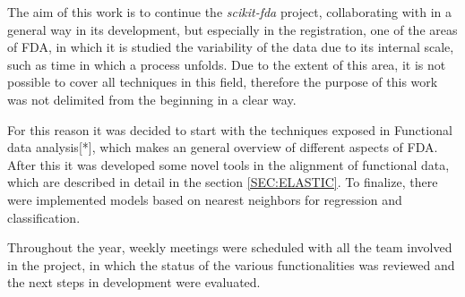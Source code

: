 The aim of this work is to continue the \textit{scikit-fda} project,
collaborating with in a general way in its development, but especially in the
registration, one of the areas of FDA, in which it is studied the
variability of the data due to its internal scale, such as time
in which a process unfolds. Due to the extent of this area, it is not possible
to cover all techniques in this field, therefore the purpose of this work was
not delimited from the beginning in a clear way.

For this reason it was decided to start with the techniques
exposed in Functional data analysis[*], which makes an general overview of different
aspects of FDA. After this it was developed some
novel tools in the alignment of functional data, which are described in detail in the
section \ref{SEC:ELASTIC}. To finalize, there were implemented models based on
nearest neighbors for regression and classification.

Throughout the year, weekly meetings were scheduled with all the team involved
in the project, in which the status of the various functionalities was reviewed
and the next steps in development were evaluated.
